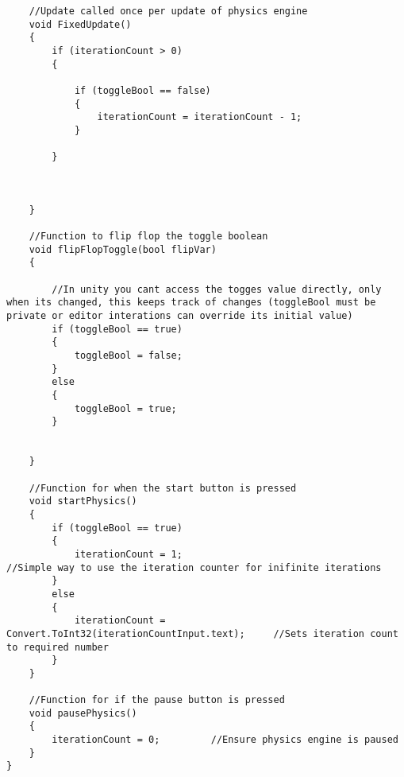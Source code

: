 \begin{mdframed}[linecolor=black, topline=true, bottomline=true,
  leftline=false, rightline=false]
\begin{verbatim}
    //Update called once per update of physics engine
    void FixedUpdate()
    {
        if (iterationCount > 0)
        {

            if (toggleBool == false)
            {
                iterationCount = iterationCount - 1;
            }
            
        } 

        

    }

    //Function to flip flop the toggle boolean
    void flipFlopToggle(bool flipVar)
    {

        //In unity you cant access the togges value directly, only when its changed, this keeps track of changes (toggleBool must be private or editor interations can override its initial value)
        if (toggleBool == true)
        {
            toggleBool = false;
        }
        else
        {
            toggleBool = true;
        }


    }

    //Function for when the start button is pressed
    void startPhysics()
    {
        if (toggleBool == true)
        {
            iterationCount = 1;                                             //Simple way to use the iteration counter for inifinite iterations
        }
        else
        {
            iterationCount = Convert.ToInt32(iterationCountInput.text);     //Sets iteration count to required number
        }
    }

    //Function for if the pause button is pressed
    void pausePhysics()
    {
        iterationCount = 0;         //Ensure physics engine is paused
    }
}

\end{verbatim}
\end{mdframed}